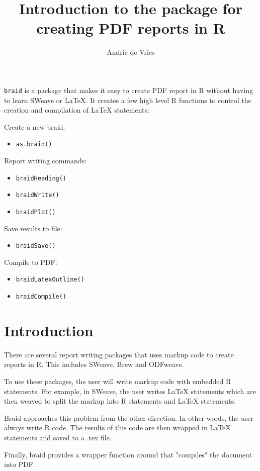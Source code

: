 \documentclass[a4paper]{article}
\title{Introduction to the \braid{} package for creating PDF reports in R}
\author{Andrie de Vries}
\newcommand{\braid}{{\tt braid}}
\newcommand{\code}[1]{{\tt #1}}
\begin{document}
\maketitle

\braid{} is a package that makes it easy to create PDF report in R without having to learn SWeave or \LaTeX{}.  It creates a few high level R functions to control the creation and compilation of \LaTeX{} statements:

Create a new braid: 
\begin{itemize}
	\item \code{as.braid()}
\end{itemize}

Report writing commands:
\begin{itemize}
	\item \code{braidHeading()}
	\item \code{braidWrite()}
	\item \code{braidPlot()}
\end{itemize}

Save results to file:
\begin{itemize}
	\item \code{braidSave()}
\end{itemize}

Compile to PDF:
\begin{itemize}
	\item \code{braidLatexOutline()}
	\item \code{braidCompile()}
\end{itemize}
	

\section{Introduction}

There are several report writing packages that uses markup code to create reports in R.  This includes SWeave, Brew and ODFweave.

To use these packages, the user will write markup code with embedded R statements.  For example, in SWeave, the user writes \LaTeX{} statements which are then weaved to split the markup into R statements and \LaTeX{} statements.

Braid approaches this problem from the other direction.  In other words, the user always write R code.  The results of this code are then wrapped in \LaTeX{} statements and saved to a .tex file.

Finally, braid provides a wrapper function around \code{} that "compiles" the document into PDF.
\end{document}
